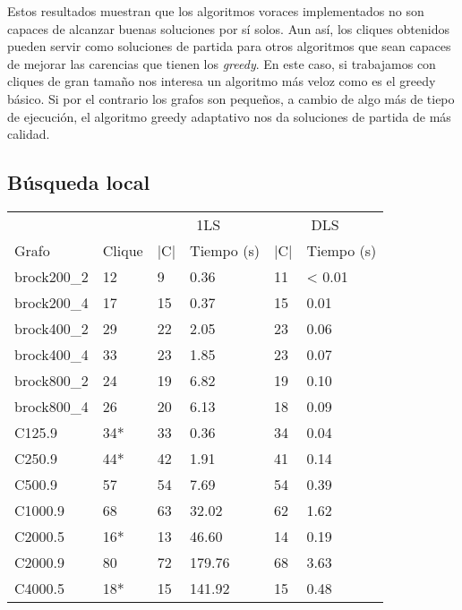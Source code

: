 Estos resultados muestran que los algoritmos voraces implementados no
son capaces de alcanzar buenas soluciones por sí solos. Aun así, los cliques
obtenidos pueden servir como soluciones de partida para otros algoritmos que sean
capaces de mejorar las carencias que tienen los \textit{greedy}. En este caso,
si trabajamos con cliques de gran tamaño nos interesa un algoritmo más veloz como
es el greedy básico. Si por el contrario los grafos son pequeños, a cambio de algo
más de tiepo de ejecución, el algoritmo greedy adaptativo nos da soluciones de
partida de más calidad.

\subsection{Búsqueda local}

\begin{small}
  \begin{longtable}{l l l l l l}
  \label{table:bl}\\
    & & \multicolumn{2}{c}{1LS} & \multicolumn{2}{c}{DLS} \\ \cline{3-6}
    Grafo              & Clique & |C| & Tiempo (s) & |C| & Tiempo (s) \\ \hline
    \endhead
    \endfoot
    brock200\_2        & 12 & 9 & 0.36 & 11 & < 0.01   \\ \hline
    brock200\_4        & 17 & 15 & 0.37 & 15 & 0.01   \\ \hline
    brock400\_2        & 29 & 22 & 2.05 & 23 & 0.06   \\ \hline
    brock400\_4        & 33 & 23 & 1.85 & 23 & 0.07   \\ \hline
    brock800\_2        & 24 & 19 & 6.82 & 19 & 0.10   \\ \hline
    brock800\_4        & 26 & 20 & 6.13 & 18 & 0.09   \\ \hline
    C125.9             & 34* & 33 & 0.36 & 34 & 0.04   \\ \hline
    C250.9             & 44* & 42 & 1.91 & 41 & 0.14   \\ \hline
    C500.9             & 57 & 54 & 7.69 & 54 & 0.39   \\ \hline
    C1000.9            & 68 & 63 & 32.02 & 62 & 1.62   \\ \hline
    C2000.5            & 16* & 13 & 46.60 & 14 & 0.19  \\ \hline
    C2000.9            & 80 & 72 & 179.76 & 68 & 3.63  \\ \hline
    C4000.5            & 18* & 15 & 141.92 & 15 & 0.48   \\ \hline

\end{longtable}
\end{small}
